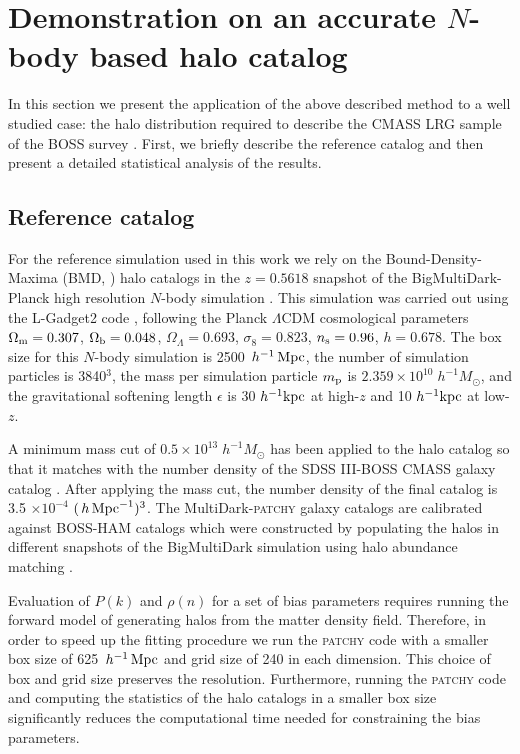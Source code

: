 \section{Demonstration on an accurate $N$-body based halo catalog}
\label{sec:mocktest}

In this section we present the application of the above described method to a well studied case: the halo distribution required to describe the CMASS LRG sample of the BOSS survey \citep{white2011,boss}.
First, we briefly describe the reference catalog and then present a detailed statistical analysis of the results.

\subsection{Reference catalog}
\label{sec:reference}

For the reference simulation used in this work we rely on the Bound-Density-Maxima (BMD, \citealt{bdm}) halo catalogs in the $z=0.5618$ snapshot of the BigMultiDark-Planck high 
resolution $N$-body simulation \citep{multidark}. This simulation was carried out using the L-Gadget2 code \citep{gadget}, following the Planck $\Lambda$CDM cosmological parameters 
$\Omega_{\rm m} = 0.307$, $\Omega_{\rm b} = 0.048$, $\Omega_{\Lambda} = 0.693$, $\sigma_{8} = 0.823$, $n_{\rm s}=0.96$, 
$h=0.678$. The box size for this $N$-body simulation is 2500 $\,h^{-1}\,{\rm Mpc}$, the number of simulation particles is 3840$^3$, 
the mass per simulation particle $m_{\rm p}$ is $2.359 \times 10^{10} \; h^{-1} M_{\odot}$, and the gravitational softening length 
$\epsilon$ is 30 $h^{-1} \rm{kpc}$ at high-$z$ and 10 $h^{-1} \rm{kpc}$ at low-$z$.

A minimum mass cut of $0.5 \times 10^{13} \; h^{-1} M_{\odot}$ has been applied to the halo catalog so that it matches with the number density of the SDSS III-BOSS CMASS galaxy catalog \citep{white2011,boss}. After applying the mass cut, the number density of the final catalog is 3.5 $\times 10^{-4}$ $(\,h\,{\rm Mpc}^{-1})^{3}$. The MultiDark-\textsc{patchy} galaxy catalogs \citep{kitaura2016} are calibrated against BOSS-HAM catalogs which were constructed by populating the halos in different snapshots of the BigMultiDark simulation using halo abundance matching \citep{sergio2016}.   

Evaluation of $P(k)$ and $\rho(n)$ for a set of bias parameters requires running the forward model of generating halos from the matter density field. Therefore, in order to speed up the fitting procedure we run the \textsc{patchy} code with a smaller box size of 625 $\,h^{-1}\,{\rm Mpc}$ and grid size of 240 in each dimension. This choice of box and grid size preserves the resolution. Furthermore, running the \textsc{patchy} code and computing the statistics of the halo catalogs in a smaller box size significantly reduces the computational time needed for constraining the bias parameters.

